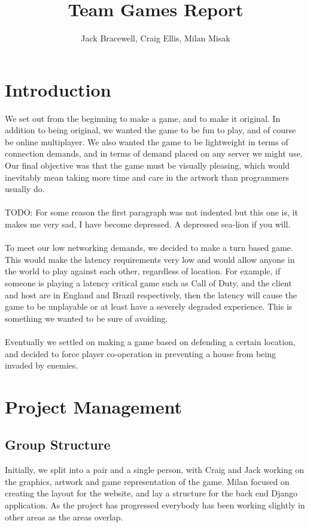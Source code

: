 \documentclass{article}
\begin{document}
\title{Team Games Report}
\author{Jack Bracewell, Craig Ellis, Milan Misak}
\date{}

\maketitle
\vspace{1.5cm}
\tableofcontents
\clearpage

\section{Introduction}
We set out from the beginning to make a game, and to make it original. In addition to being original, we wanted the game to be fun to play, and of course be online multiplayer. We also wanted the game to be lightweight in terms of connection demands, and in terms of demand placed on any server we might use. Our final objective was that the game must be visually pleasing, which would inevitably mean taking more time and care in the artwork than programmers usually do. \\ \\

TODO: For some reason the first paragraph was not indented but this one is, it makes me very sad, I have become depressed. A depressed sea-lion if you will. \\ \\

To meet our low networking demands, we decided to make a turn based game. This would make the latency requirements very low and would allow anyone in the world to play against each other, regardless of location. For example, if someone is playing a latency critical game such as Call of Duty, and the client and host are in England and Brazil respectively, then the latency will cause the game to be unplayable or at least have a severely degraded experience. This is something we wanted to be sure of avoiding. \\ \\

Eventually we settled on making a game based on defending a certain location, and decided to force player co-operation in preventing a house from being invaded by enemies. 


\section{Project Management}

\subsection{Group Structure}
Initially, we split into a pair and a single person, with Craig and Jack working on the graphics, artwork and game representation of the game. Milan focused on creating the layout for the website, and lay a structure for the back end Django application. As the project has progressed everybody has been working slightly in other areas as the areas overlap.
\end{document}
